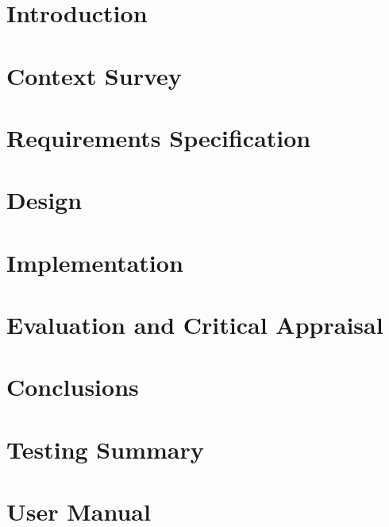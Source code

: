 \documentclass[12pt]{report}
\begin{document}
\tableofcontents

\chapter{Introduction}


\chapter{Context Survey}


\chapter{Requirements Specification}




\chapter{Design}


\chapter{Implementation}


\chapter{Evaluation and Critical Appraisal}


\chapter{Conclusions}



\appendix
\chapter{Testing Summary}

\chapter{User Manual}
\end{document}
